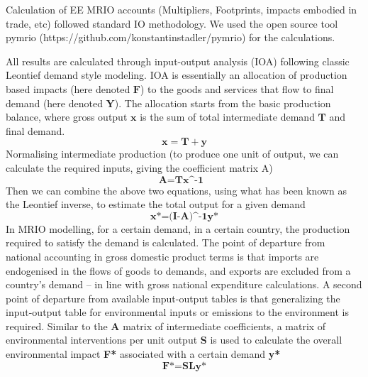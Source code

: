 Calculation of EE MRIO accounts (Multipliers, Footprints, impacts embodied in trade, etc) followed
standard IO methodology. We used the open source tool pymrio (https://github.com/konstantinstadler/pymrio) for the calculations.

All results are  calculated through input-output analysis (IOA) following classic Leontief demand style modeling. IOA is essentially an allocation of production based impacts (here denoted $\textbf{F}$) to the goods and services that flow to final demand (here denoted $\textbf{Y}$). The allocation starts from the basic production balance, where gross output $\textbf{x}$ is the sum of total intermediate demand $\textbf{T}$ and final demand. 
\begin{equation}
\textbf{x}=\textbf{T}+\textbf{y}
\end{equation}
Normalising intermediate production (to produce one unit of output, we can calculate the required inputs, giving the coefficient matrix A)
\begin{equation}
\textbf{A=T{x^-1} }
\end{equation}
Then we can combine the above two equations, using what has been known as the Leontief inverse, to estimate the total output for a given demand
\begin{equation}
\textbf{x*={(I-A)^-1}y*}
\end{equation}
In MRIO modelling, for a certain demand, in a certain country, the production required to satisfy the demand is calculated. The point of departure from national accounting in gross domestic product terms is that imports are endogenised in the flows of goods to demands, and exports are excluded from a country’s demand – in line with gross national expenditure calculations. A second point of departure from available input-output tables is that generalizing the input-output table for environmental inputs or emissions to the environment is required. Similar to the \textbf{A} matrix of intermediate coefficients, a matrix of environmental interventions per unit output \textbf{S} is used to calculate the overall environmental impact \textbf{F*} associated with a certain demand \textbf{y*} 
\begin{equation}
\textbf{F*=SLy*}
\end{equation}